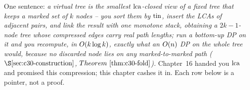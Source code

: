

One sentence: \emph{a virtual tree is the smallest \(\operatorname{lca}\)-closed view of a fixed tree
that keeps a marked set of \(k\) nodes -- you sort them by \(\operatorname{tin}\), insert the LCAs of
adjacent pairs, and link the result with one monotone stack, obtaining a \(2k-1\)-node
tree whose compressed edges carry real path lengths; run a bottom-up DP on \emph{it} and
you recompute, in \(O(k\log k)\), exactly what an \(O(n)\) DP on the whole tree
would, because no discarded node lies on any marked-to-marked path
(\(\secref{c30-construction}\), \(\thmref{c30-fold}\)).} Chapter~16 handed you \(\operatorname{lca}\) and
promised this compression; this chapter cashes it in. Each row below is a pointer, not a proof.

